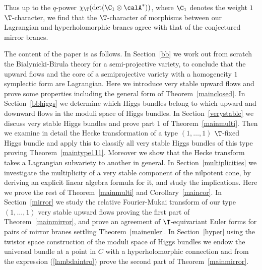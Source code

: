 Thus up to the $q$-power $\chi_\T(\det(\C_{1}\otimes\calA^*))$, where $\C_1$ denotes the weight $1$ $\T$-character,  we find that the $\T$-character of morphisms between our Lagrangian and hyperholomorphic branes agree with that of the conjectured mirror branes.

The content of  the paper is as follows. In Section~\ref{bb} we work out from scratch the Bialynicki-Birula theory for a semi-projective variety,  to conclude that the upward flows and the core of a semiprojective variety with a homogeneity $1$ symplectic form are Lagrangian. Here we  introduce very stable upward flows and prove some  properties including the general form of Theorem~\ref{mainclosed}.  In Section~\ref{bbhiggs} we determine which Higgs bundles belong to which upward and downward flows in the moduli space of Higgs bundles. In Section~\ref{verystable} we discuss very stable Higgs bundles and prove part $1$ of Theorem~\ref{mainmulti}. Then we examine in detail the Hecke transformation  of a  type $(1,\dots,1)$ $\T$-fixed Higgs bundle and apply this to classify all very stable Higgs bundles of this type proving Theorem~\ref{maintype111}. Moreover we show that the Hecke transform takes a Lagrangian subvariety to another in general. In Section~\ref{multiplicities} we investigate the multiplicity of a very stable component of the nilpotent cone, by deriving an explicit linear algebra formula for it, and study the implications. Here we prove the rest of Theorem~\ref{mainmulti} and Corollary~\ref{maincor}.  In Section~\ref{mirror} we study the relative Fourier-Mukai transform of our type $(1,\dots,1)$ very stable upward flows proving the first part of  Theorem~\ref{mainmirror}, and prove an agreement of $\T$-equivariant Euler forms for pairs of mirror branes settling Theorem~\ref{maineuler}. In Section~\ref{hyper} using the twistor space construction of the moduli space of Higgs bundles we endow the universal bundle at a point in $C$ with a hyperholomorphic connection and from the expression (\ref{lambdaintro}) prove  the second part of Theorem~\ref{mainmirror}.

